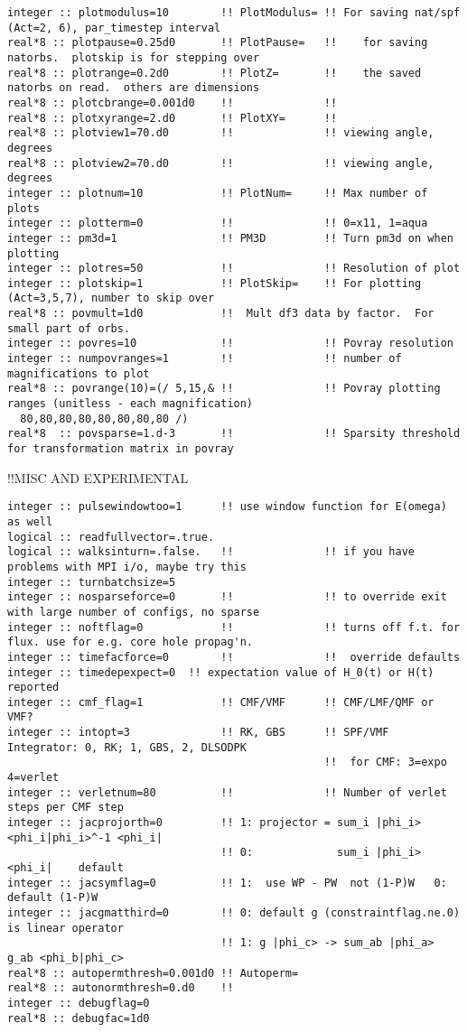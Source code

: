 \begin{verbatim}
integer :: plotmodulus=10        !! PlotModulus= !! For saving nat/spf (Act=2, 6), par_timestep interval
real*8 :: plotpause=0.25d0       !! PlotPause=   !!    for saving natorbs.  plotskip is for stepping over
real*8 :: plotrange=0.2d0        !! PlotZ=       !!    the saved natorbs on read.  others are dimensions
real*8 :: plotcbrange=0.001d0    !!              !!    
real*8 :: plotxyrange=2.d0       !! PlotXY=      !!    
real*8 :: plotview1=70.d0        !!              !! viewing angle, degrees
real*8 :: plotview2=70.d0        !!              !! viewing angle, degrees
integer :: plotnum=10            !! PlotNum=     !! Max number of plots
integer :: plotterm=0            !!              !! 0=x11, 1=aqua
integer :: pm3d=1                !! PM3D         !! Turn pm3d on when plotting
integer :: plotres=50            !!              !! Resolution of plot
integer :: plotskip=1            !! PlotSkip=    !! For plotting (Act=3,5,7), number to skip over
real*8 :: povmult=1d0            !!  Mult df3 data by factor.  For small part of orbs.
integer :: povres=10             !!              !! Povray resolution
integer :: numpovranges=1        !!              !! number of magnifications to plot
real*8 :: povrange(10)=(/ 5,15,& !!              !! Povray plotting ranges (unitless - each magnification)
  80,80,80,80,80,80,80,80 /)
real*8  :: povsparse=1.d-3       !!              !! Sparsity threshold for transformation matrix in povray
\end{verbatim}
!!{\large \quad MISC AND EXPERIMENTAL}
\begin{verbatim}
integer :: pulsewindowtoo=1      !! use window function for E(omega) as well
logical :: readfullvector=.true.
logical :: walksinturn=.false.   !!              !! if you have problems with MPI i/o, maybe try this
integer :: turnbatchsize=5
integer :: nosparseforce=0       !!              !! to override exit with large number of configs, no sparse
integer :: noftflag=0            !!              !! turns off f.t. for flux. use for e.g. core hole propag'n.
integer :: timefacforce=0        !!              !!  override defaults
integer :: timedepexpect=0  !! expectation value of H_0(t) or H(t) reported
integer :: cmf_flag=1            !! CMF/VMF      !! CMF/LMF/QMF or VMF?
integer :: intopt=3              !! RK, GBS      !! SPF/VMF Integrator: 0, RK; 1, GBS, 2, DLSODPK  
                                                 !!  for CMF: 3=expo 4=verlet
integer :: verletnum=80          !!              !! Number of verlet steps per CMF step
integer :: jacprojorth=0         !! 1: projector = sum_i |phi_i> <phi_i|phi_i>^-1 <phi_i|
                                 !! 0:             sum_i |phi_i> <phi_i|    default
integer :: jacsymflag=0          !! 1:  use WP - PW  not (1-P)W   0: default (1-P)W
integer :: jacgmatthird=0        !! 0: default g (constraintflag.ne.0) is linear operator
                                 !! 1: g |phi_c> -> sum_ab |phi_a> g_ab <phi_b|phi_c>
real*8 :: autopermthresh=0.001d0 !! Autoperm=
real*8 :: autonormthresh=0.d0    !! 
integer :: debugflag=0
real*8 :: debugfac=1d0
\end{verbatim}
